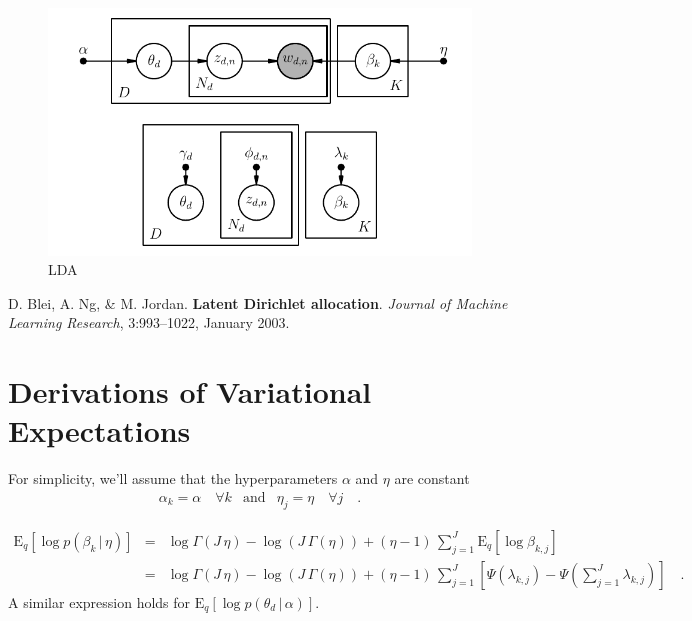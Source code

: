 \documentclass[11pt]{article}
\newcommand{\figlabel}[1]{\label{fig:#1}}
\newcommand{\expect}[2]{\ensuremath{\mathrm{E}_{#1}\left [ {#2} \right ]}}
\begin{document}
\begin{figure}
\begin{center}
\includegraphics{lda.pdf}
\end{center}
\caption{%
LDA
\figlabel{lda}}
\end{figure}

\begin{thebibliography}{}\raggedright

D. Blei, A. Ng, \& M. Jordan. \textbf{Latent Dirichlet allocation}.
\emph{Journal of Machine Learning Research}, 3:993–1022, January 2003.

\end{thebibliography}

\appendix

\section{Derivations of Variational Expectations}

For simplicity, we'll assume that the hyperparameters $\alpha$ and $\eta$ are
constant
\begin{eqnarray}
\alpha_k = \alpha\quad\forall k &\mathrm{and}&
\eta_j = \eta\quad\forall j \quad.
\end{eqnarray}

\begin{eqnarray}
\expect{q}{\log p(\beta_k\,|\,\eta)} &=&
\log \Gamma (J\,\eta) - \log \left ( J\,\Gamma(\eta) \right )
+ (\eta-1)\,\sum_{j=1}^J \expect{q}{\log\beta_{k,j}} \nonumber\\
&=&
\log \Gamma (J\,\eta) - \log \left ( J\,\Gamma(\eta) \right )
+ (\eta-1)\,\sum_{j=1}^J \left[ \Psi (\lambda_{k,j})
- \Psi({\textstyle\sum}_{j=1}^J \lambda_{k,j}) \right] \quad.
\end{eqnarray}
A similar expression holds for $\expect{q}{\log p(\theta_d\,|\,\alpha)}$.
\end{document}
